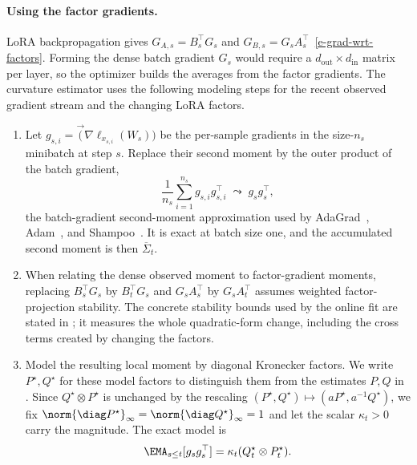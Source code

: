 \paragraph{Using the factor gradients.} LoRA backpropagation gives
$G_{A,s}=B_s^\top G_s$ and
$G_{B,s}=G_sA_s^\top$~\eqref{e-grad-wrt-factors}. Forming the dense batch
gradient $G_s$ would require a $d_{\mathrm{out}}\times d_{\mathrm{in}}$
matrix per layer, so the optimizer builds the averages from the factor
gradients. The curvature estimator uses the following modeling steps for
the recent observed gradient stream and the changing LoRA factors.
\begin{enumerate}[leftmargin=1.6em,itemsep=2pt,topsep=2pt]
  \item Let
  $g_{s,i}=\vec(\nabla\ell_{x_{s,i}}(W_s))$ be the per-sample gradients in
  the size-$n_s$ minibatch at step $s$. Replace their second moment by the
  outer product of the batch gradient,
  \[
    \frac1{n_s}\sum_{i=1}^{n_s}g_{s,i}g_{s,i}^\top
    \;\leadsto\;
    g_sg_s^\top ,
  \]
  the batch-gradient second-moment approximation used by
  AdaGrad~\cite{adagrad}, Adam~\cite{adam}, and Shampoo~\cite{shampoo}.
  It is exact at batch size one, and the accumulated second moment is then
  $\overline{\Sigma}_t$.
  \item When relating the dense observed moment to factor-gradient moments,
  replacing $B_s^\top G_s$ by $B_t^\top G_s$ and
  $G_sA_s^\top$ by $G_sA_t^\top$ assumes weighted factor-projection
  stability. The concrete stability bounds used by the online fit are stated in
  ; it measures the whole quadratic-form
  change, including the cross terms created by changing the factors.
  \item Model the resulting local moment by diagonal Kronecker factors. We write
  $P^\star,Q^\star$ for these model factors to distinguish them from the
  estimates $P,Q$ in . Since
  $Q^\star\otimes P^\star$ is unchanged by the
  rescaling $(P^\star,Q^\star)\mapsto(aP^\star,a^{-1}Q^\star)$, we fix
  $\norm{\diag P^\star}_\infty=\norm{\diag Q^\star}_\infty=1$ and let the
  scalar $\kappa_t>0$ carry the magnitude. The exact model is
  \begin{equation}\label{e-diag-kron-second-mom-model-w1}
    \EMA_{s \leq t}[g_sg_s^\top]
    =
    \kappa_t(Q^\star_t\otimes P^\star_t).
  \end{equation}
\end{enumerate}

